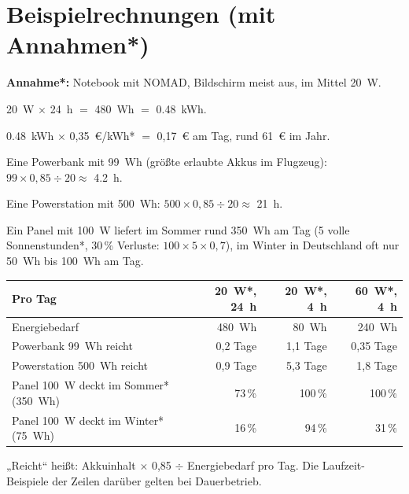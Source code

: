 
\section{Beispielrechnungen (mit Annahmen*)}
\textbf{Annahme*:} Notebook mit NOMAD, Bildschirm meist aus, im Mittel \SI{20}{W}.

\begin{description}[leftmargin=1.2em,style=nextline]
\item[Wie viel Energie am Tag?] \SI{20}{W} $\times$ 24~h $=$ \SI{480}{Wh} $=$ \SI{0,48}{kWh}.
\item[Kosten bei Dauerbetrieb?] \SI{0,48}{kWh} $\times$ 0,35~€/kWh* $=$ 0,17~€ am Tag, rund 61~€ im Jahr.
\item[Laufzeit an einer Powerbank?] Eine Powerbank mit \SI{99}{Wh} (größte erlaubte Akkus im Flugzeug): $99 \times 0{,}85 \div 20 \approx$ \SI{4,2}{h}.
\item[Laufzeit an einer Powerstation?] Eine Powerstation mit \SI{500}{Wh}: $500 \times 0{,}85 \div 20 \approx$ \SI{21}{h}.
\item[Wie viel Solarfläche?] Ein Panel mit \SI{100}{W} liefert im Sommer rund \SI{350}{Wh} am Tag (5 volle Sonnenstunden*, 30\,\% Verluste: $100 \times 5 \times 0{,}7$), im Winter in Deutschland oft nur \SI{50}{Wh} bis \SI{100}{Wh} am Tag.
\end{description}

\begin{center}\small
\renewcommand{\arraystretch}{1.25}
\begin{tabular}{@{}lrrr@{}}
\toprule
\textbf{Pro Tag} & \textbf{20~W*, 24~h} & \textbf{20~W*, 4~h} & \textbf{60~W*, 4~h} \\
\midrule
Energiebedarf & \SI{480}{Wh} & \SI{80}{Wh} & \SI{240}{Wh} \\
Powerbank \SI{99}{Wh} reicht & 0,2 Tage & 1,1 Tage & 0,35 Tage \\
Powerstation \SI{500}{Wh} reicht & 0,9 Tage & 5,3 Tage & 1,8 Tage \\
Panel \SI{100}{W} deckt im Sommer* (\SI{350}{Wh}) & 73\,\% & 100\,\% & 100\,\% \\
Panel \SI{100}{W} deckt im Winter* (\SI{75}{Wh}) & 16\,\% & 94\,\% & 31\,\% \\
\bottomrule
\end{tabular}
\end{center}
\small „Reicht“ heißt: Akkuinhalt $\times$ 0,85 $\div$ Energiebedarf pro Tag. Die Laufzeit-Beispiele der Zeilen darüber gelten bei Dauerbetrieb.\normalsize

